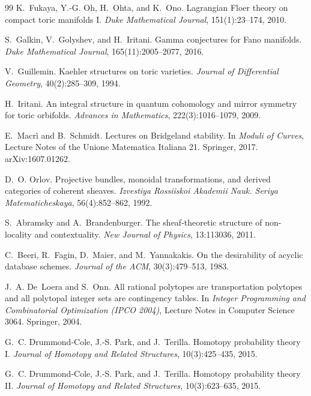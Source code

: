 \documentclass[11pt]{article}
\theoremstyle{definition}
\theoremstyle{remark}
\begin{document}
\begin{thebibliography}{99}
K.~Fukaya, Y.-G. Oh, H.~Ohta, and K.~Ono.
\newblock Lagrangian {F}loer theory on compact toric manifolds {I}.
\newblock \emph{Duke Mathematical Journal}, 151(1):23--174, 2010.

S.~Galkin, V.~Golyshev, and H.~Iritani.
\newblock Gamma conjectures for {F}ano manifolds.
\newblock \emph{Duke Mathematical Journal}, 165(11):2005--2077, 2016.

V.~Guillemin.
\newblock Kaehler structures on toric varieties.
\newblock \emph{Journal of Differential Geometry}, 40(2):285--309, 1994.

H.~Iritani.
\newblock An integral structure in quantum cohomology and mirror symmetry for toric orbifolds.
\newblock \emph{Advances in Mathematics}, 222(3):1016--1079, 2009.

E.~Macr\`i and B.~Schmidt.
\newblock Lectures on {B}ridgeland stability.
\newblock In \emph{Moduli of Curves}, Lecture Notes of the Unione Matematica Italiana 21. Springer,
2017. arXiv:1607.01262.

D.~O. Orlov.
\newblock Projective bundles, monoidal transformations, and derived categories of coherent sheaves.
\newblock \emph{Izvestiya Rossiiskoi Akademii Nauk. Seriya Matematicheskaya}, 56(4):852--862, 1992.

S.~Abramsky and A.~Brandenburger.
\newblock The sheaf-theoretic structure of non-locality and contextuality.
\newblock \emph{New Journal of Physics}, 13:113036, 2011.

C.~Beeri, R.~Fagin, D.~Maier, and M.~Yannakakis.
\newblock On the desirability of acyclic database schemes.
\newblock \emph{Journal of the ACM}, 30(3):479--513, 1983.

J.~A. De~Loera and S.~Onn.
\newblock All rational polytopes are transportation polytopes and all polytopal integer sets are contingency
tables.
\newblock In \emph{Integer Programming and Combinatorial Optimization (IPCO 2004)}, Lecture Notes in Computer
Science 3064. Springer, 2004.

G.~C. Drummond-Cole, J.-S. Park, and J.~Terilla.
\newblock Homotopy probability theory {I}.
\newblock \emph{Journal of Homotopy and Related Structures}, 10(3):425--435, 2015.

G.~C. Drummond-Cole, J.-S. Park, and J.~Terilla.
\newblock Homotopy probability theory {II}.
\newblock \emph{Journal of Homotopy and Related Structures}, 10(3):623--635, 2015.


\end{thebibliography}
\end{document}
